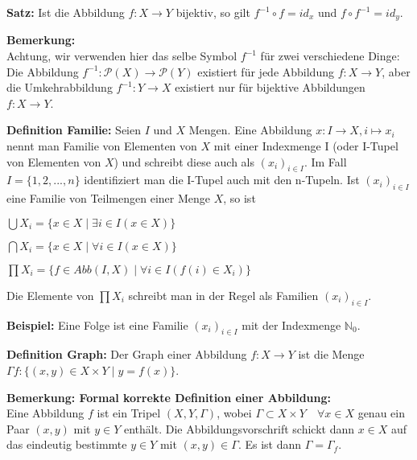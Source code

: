 \documentclass[11pt]{article}
\begin{document}
			\begin{framed}
				\textbf{Satz:} Ist die Abbildung $f: X \to Y$ bijektiv, so gilt $f^{-1} \circ f = id_x$ und
				$f \circ f^{-1} = id_y$.
			\end{framed}
			
			\textbf{Bemerkung:} \\
			Achtung, wir verwenden hier das selbe Symbol $f^{-1}$ f\"ur zwei verschiedene Dinge: Die Abbildung
			$f^{-1}: \mathcal P(X) \to \mathcal P(Y)$ existiert f\"ur jede Abbildung $f: X \to Y$, aber die
			Umkehrabbildung $f^{-1}: Y \to X$ existiert nur f\"ur bijektive Abbildungen $f: X \to Y$. \\
			
			\begin{framed}
				\textbf{Definition Familie:} Seien $I$ und $X$ Mengen. Eine Abbildung $x: I \to X, i \mapsto
				x_i$ nennt man Familie von Elementen von $X$ mit einer Indexmenge I (oder I-Tupel von 
				Elementen von $X$) und schreibt diese auch als $(x_i)_{i \in I}$. Im Fall $I=\{1,2,...,n\}$
				identifiziert man die I-Tupel auch mit den n-Tupeln. Ist $(x_i)_{i \in I}$ eine Familie von
				Teilmengen einer Menge $X$, so ist 
				\begin{compactitem}
					\item $\bigcup X_i = \{x \in X \mid \exists i \in I(x \in X)\}$
					\item $\bigcap X_i = \{x \in X \mid \forall i \in I(x \in X)\}$
					\item $\prod X_i = \{f \in Abb(I,X) \mid \forall i \in I(f(i) \in X_i)\}$
				\end{compactitem}
				Die Elemente von $\prod X_i$ schreibt man in der Regel als Familien $(x_i)_{i \in I}$.
			\end{framed}
			
			\textbf{Beispiel: } Eine Folge ist eine Familie $(x_i)_{i \in I}$ mit der Indexmenge $\mathbb N_0$.
			
			\begin{framed}
				\textbf{Definition Graph:} Der Graph einer Abbildung $f: X \to Y$ ist die Menge $\Gamma f: 
				\{(x,y) \in X \times Y \mid y=f(x)\}$.
			\end{framed}
			
			\textbf{Bemerkung: Formal korrekte Definition einer Abbildung:} \\
			Eine Abbildung $f$ ist ein Tripel $(X,Y,\Gamma)$, wobei $\Gamma \subset X \times Y \quad \forall
			x \in X$ genau ein Paar $(x,y)$ mit $y \in Y$ enth\"alt. Die Abbildungsvorschrift schickt dann
			$x \in X$ auf das eindeutig bestimmte $y \in Y$ mit $(x,y) \in \Gamma$. Es ist dann $\Gamma =
			\Gamma_f$.
			
\end{document}
